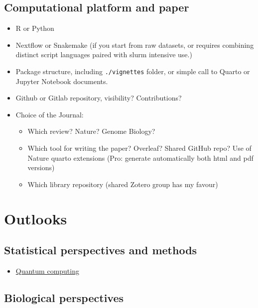 \documentclass[
  letterpaper,
]{book}
\providecommand{\tightlist}{%
  \setlength{\itemsep}{0pt}\setlength{\parskip}{0pt}}\usepackage{longtable,booktabs,array}
\begin{document}
\subsection{Computational platform and
paper}\label{computational-platform-and-paper}

\begin{itemize}
\tightlist
\item
  R or Python
\item
  Nextflow or Snakemake (if you start from raw datasets, or requires
  combining distinct script languages paired with slurm intensive use.)
\item
  Package structure, including \texttt{./vignettes} folder, or simple
  call to Quarto or Jupyter Notebook documents.
\item
  Github or Gitlab repository, visibility? Contributions?
\item
  Choice of the Journal:

  \begin{itemize}
  \tightlist
  \item
    Which review? Nature? Genome Biology?
  \item
    Which tool for writing the paper? Overleaf? Shared GitHub repo? Use
    of Nature quarto extensions (Pro: generate automatically both html
    and pdf versions)
  \item
    Which library repository (shared Zotero group has my favour)
  \end{itemize}
\end{itemize}

\section{Outlooks}\label{outlooks}

\subsection{Statistical perspectives and
methods}\label{statistical-perspectives-and-methods}

\begin{itemize}
\tightlist
\item
  \href{https://research.ibm.com/publications/a-perspective-on-quantum-computing-for-analyzing-cell-cell-communication-networks}{Quantum
  computing}
\end{itemize}

\subsection{Biological perspectives}\label{biological-perspectives}
\end{document}
